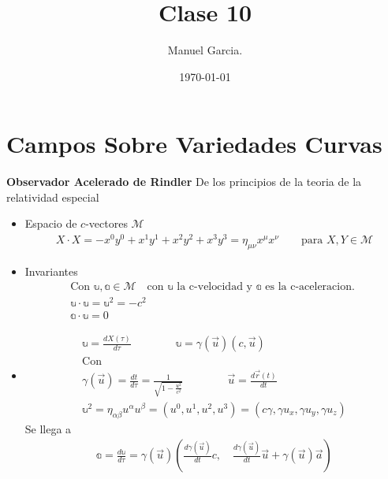 \documentclass{article}
\title{Clase 10 }
\author{Manuel Garcia.}
\date{\today}
\newcommand{\caja}[3]{%
  \begin{tcolorbox}[colback=#1!5!white,colframe=#1!25!black,title=#2]
    #3
  \end{tcolorbox}%
}
\begin{document}
\maketitle

\section{Campos Sobre Variedades Curvas }

\caja{black}{Apéndice A }{
  \textbf{Observador Acelerado de Rindler }
  De los principios de la teoria de la relatividad especial 
  \begin{itemize}
    \item Espacio de $ c $-vectores $ \mathcal M  $
      \begin{gather*}
        X \cdot X = - x ^ {0 } y ^ {0 } + x ^ {1 } y ^ {1 } + x ^ {2 }y ^ {2 } + x ^ {3 } y ^ {3 } =\eta _{\mu\nu} x ^ {\mu} x ^ {\nu} \qquad \text{para } X , Y \in \mathcal M   
      \end{gather*}
    \item Invariantes 
      \begin{gather*}
        \text{Con }\mathbb u, \mathbb a \in \mathcal M \quad \text{con } \mathbb u \text{ la c-velocidad y }\mathbb a \text{ es la c-aceleracion. }\\
        \mathbb u\cdot \mathbb u = \mathbb u ^ {2 } = - c ^ {2 } \\
        \mathbb a \cdot \mathbb u = 0 
      \end{gather*}
    \item 
      \begin{gather*}
        \mathbb u = \frac{d X(\tau ) }{d \tau } \qquad \qquad \mathbb u = \gamma(\vec u ) (c, \vec u ) \\
        \text{Con }\\
        \gamma(\vec u )= \frac{d t  }{d  \tau} = \frac{1}{\sqrt{1 - \frac{u ^2}{c ^2}} } \qquad \qquad \vec u = \frac{d \vec r (t) }{d t } \\
        \mathbb u ^ {2 } = \eta _{\alpha\beta} u ^ {\alpha} u ^ {\beta} = (u ^ {0 }, u ^ {1 }, u ^ {2 }, u ^ {3 }) = (c\gamma, \gamma u_x, \gamma u_y, \gamma u_z)
      \end{gather*}
      Se llega a 
      \begin{gather*}
        \mathbb a = \frac{d \mathbb u  }{d \tau} = \gamma(\vec u ) \left(\frac{d \gamma(\vec u ) }{d t} c , \quad \frac{d \gamma(\vec u ) }{d t } \vec u + \gamma(\vec u ) \vec a \right) 
      \end{gather*}
  \end{itemize}
}
\end{document}
